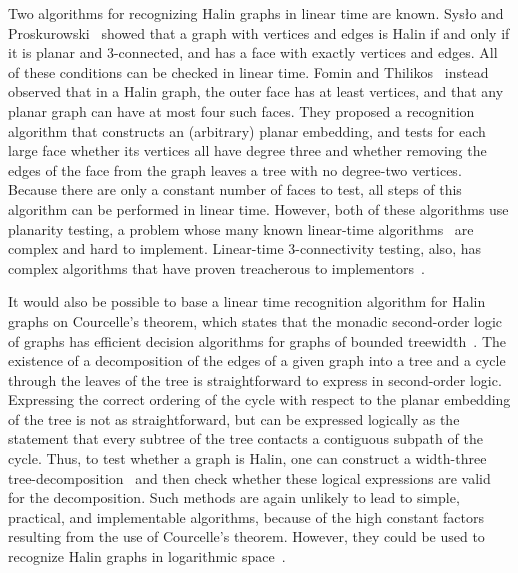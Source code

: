 \documentclass{article}
\begin{document}
Two algorithms for recognizing Halin graphs in linear time are known. Sys{\l}o and Proskurowski~\cite{SysPro-GT-83} showed that a graph with  vertices and  edges is Halin if and only if it is planar and 3-connected, and has a face with exactly  vertices and edges. All of these conditions can be checked in linear time. Fomin and Thilikos~\cite{FomThi-JDA-06} instead observed that in a Halin graph, the outer face has at least  vertices, and that any planar graph can have at most four such faces. They proposed a recognition algorithm that constructs an (arbitrary) planar embedding, and tests for each large face whether its vertices all have degree three and whether removing the edges of the face from the graph leaves a tree with no degree-two vertices. Because there are only a constant number of faces to test, all steps of this algorithm can be performed in linear time. However, both of these algorithms use planarity testing, a problem whose many known linear-time algorithms~\cite{HopTar-JACM-74,BooLue-JCSS-76,ChiNisAbe-JCSS-85,ShiHsu-TCS-99,BoyMyr-JGAA-04,FraOssRos-IJFCS-06,Sch-MFCS-13} are complex and hard to implement. Linear-time 3-connectivity testing, also, has complex algorithms that have proven treacherous to implementors~\cite{HopTar-SJC-73,GutMut-GD-00}.

It would also be possible to base a linear time recognition algorithm for Halin graphs on Courcelle's theorem, which states that the monadic second-order logic of graphs has efficient decision algorithms for graphs of bounded treewidth~\cite{Cou-IC-90}. The existence of a decomposition of the edges of a given graph into a tree and a cycle through the leaves of the tree is straightforward to express in second-order logic. Expressing the correct ordering of the cycle with respect to the planar embedding of the tree is not as straightforward, but can be expressed logically as the statement that every subtree of the tree contacts a contiguous subpath of the cycle. Thus, to test whether a graph is Halin, one can construct a width-three tree-decomposition~\cite{Bod-SJC-96} and then check whether these logical expressions are valid for the decomposition. Such methods are again unlikely to lead to simple, practical, and implementable algorithms, because of the high constant factors resulting from the use of Courcelle's theorem. However, they could be used to recognize Halin graphs in logarithmic space~\cite{ElbJakTan-FOCS-10}.
\end{document}
